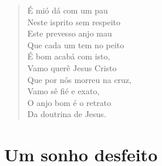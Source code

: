 \begin{verse}
É mió dá com um pau\\
Neste isprito sem respeito\\
Este prevesso anjo mau\\
Que cada um tem no peito\\
É bom acabá com isto,\\
Vamo querê Jesus Cristo\\
Que por nós morreu na cruz,\\
Vamo sê fié e exato,\\
O anjo bom é o retrato\\
Da doutrina de Jesus.
\end{verse}

\chapter{Um sonho desfeito}

